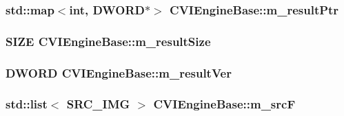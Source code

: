 \hypertarget{class_c_v_i_engine_base_a34c8596778c068f60030853df3589147}{
\subsubsection[{m\+\_\+result\+Ptr}]{\setlength{\rightskip}{0pt plus 5cm}std\+::map$<$int, D\+W\+O\+R\+D$\ast$$>$ C\+V\+I\+Engine\+Base\+::m\+\_\+result\+Ptr}}\label{class_c_v_i_engine_base_a34c8596778c068f60030853df3589147}




\hypertarget{class_c_v_i_engine_base_aec00e6d3113182f3193b3b4345c4e433}{
\subsubsection[{m\+\_\+result\+Size}]{\setlength{\rightskip}{0pt plus 5cm}S\+I\+Z\+E C\+V\+I\+Engine\+Base\+::m\+\_\+result\+Size}}\label{class_c_v_i_engine_base_aec00e6d3113182f3193b3b4345c4e433}




\hypertarget{class_c_v_i_engine_base_a756c886b931c2c905085558d219d4045}{
\subsubsection[{m\+\_\+result\+Ver}]{\setlength{\rightskip}{0pt plus 5cm}D\+W\+O\+R\+D C\+V\+I\+Engine\+Base\+::m\+\_\+result\+Ver}}\label{class_c_v_i_engine_base_a756c886b931c2c905085558d219d4045}




\hypertarget{class_c_v_i_engine_base_a67a15f389d32a0201997a71dc4695803}{
\subsubsection[{m\+\_\+src\+F}]{\setlength{\rightskip}{0pt plus 5cm}std\+::list$<$ S\+R\+C\+\_\+\+I\+M\+G $>$ C\+V\+I\+Engine\+Base\+::m\+\_\+src\+F}}\label{class_c_v_i_engine_base_a67a15f389d32a0201997a71dc4695803}




